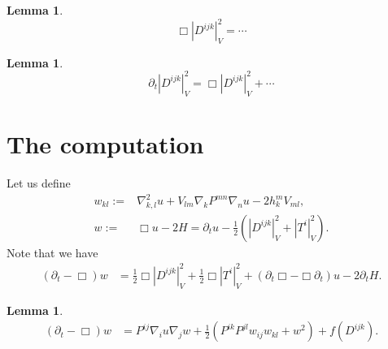 \documentclass{amsart}
\newtheorem{lemma}[theorem]{Lemma}
\theoremstyle{definition}
\theoremstyle{remark}
\numberwithin{equation}{section}
\begin{document}
\begin{lemma}
\[\Box\left|D^{ijk}\right|^2_V=\cdots\]
\end{lemma}
\begin{lemma}
\[\partial_t\left|D^{ijk}\right|^2_V=\Box\left|D^{ijk}\right|^2_V+\cdots\]
\end{lemma}
\section{The computation}
Let us define
\begin{align*}
w_{kl}:=&\nabla^2_{k,l}u+V_{lm}\nabla_kP^{mn}\nabla_nu-2h_k^mV_{ml},\\
w:=&\Box u-2H=\partial_tu-\frac{1}{2}\left(\left|D^{ijk}\right|^2_V+\left|T^i\right|_V^2\right).
\end{align*}
Note that we have
\begin{align*}
(\partial_t-\Box)w
&= \frac{1}{2}\Box\left|D^{ijk}\right|^2_V+\frac{1}{2}\Box\left|T^i\right|_V^2+(\partial_t \Box-\Box\partial_t) u-2\partial_tH.
\end{align*}
\begin{lemma}
\begin{align*}
(\partial_t-\Box)w&=P^{ij}\nabla_i u\nabla_j w+ \frac{1}{2}\left(P^{ik}P^{jl}w_{ij}w_{kl}+w^2\right)+f(D^{ijk}).\\
\end{align*}
\end{lemma}
\end{document}
